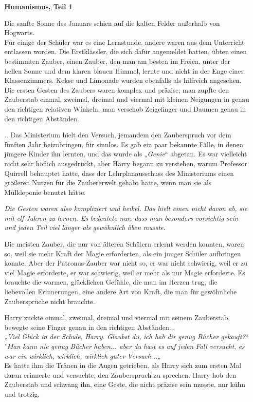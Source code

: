 

\hypertarget{humanismus-teil-1}{%

\textbf{\uline{Humanismus, Teil 1}}

\hfill\break Die sanfte Sonne des Januars schien auf die kalten Felder außerhalb von Hogwarts.\\ Für einige der Schüler war es eine Lernstunde, andere waren aus dem Unterricht entlassen worden. Die Erstklässler, die sich dafür angemeldet hatten, übten einen bestimmten Zauber, einen Zauber, den man am besten im Freien, unter der hellen Sonne und dem klaren blauen Himmel, lernte und nicht in der Enge eines Klassenzimmers. Kekse und Limonade wurden ebenfalls als hilfreich angesehen. Die ersten Gesten des Zaubers waren komplex und präzise; man zupfte den Zauberstab einmal, zweimal, dreimal und viermal mit kleinen Neigungen in genau den richtigen relativen Winkeln, man verschob Zeigefinger und Daumen genau in den richtigen Abständen.

.. Das Ministerium hielt den Versuch, jemandem den Zauberspruch vor dem fünften Jahr beizubringen, für sinnlos. Es gab ein paar bekannte Fälle, in denen jüngere Kinder ihn lernten, und das wurde als „\emph{Genie}“ abgetan. Es war vielleicht nicht sehr höflich ausgedrückt, aber Harry begann zu verstehen, warum Professor Quirrell behauptet hatte, dass der Lehrplanausschuss des Ministeriums einen größeren Nutzen für die Zaubererwelt gehabt hätte, wenn man sie als Mülldeponie benutzt hätte.

\emph{Die Gesten waren also kompliziert und heikel. Das hielt einen nicht davon ab, sie mit elf Jahren zu lernen. Es bedeutete nur, dass man besonders vorsichtig sein und jeden Teil viel länger als gewöhnlich üben musste.}

Die meisten Zauber, die nur von älteren Schülern erlernt werden konnten, waren so, weil sie mehr Kraft der Magie erforderten, als ein junger Schüler aufbringen konnte. Aber der Patronus-Zauber war nicht so, er war nicht schwierig, weil er zu viel Magie erforderte, er war schwierig, weil er mehr als nur Magie erforderte. Es brauchte die warmen, glücklichen Gefühle, die man im Herzen trug, die liebevollen Erinnerungen, eine andere Art von Kraft, die man für gewöhnliche Zaubersprüche nicht brauchte.

Harry zuckte einmal, zweimal, dreimal und viermal mit seinem Zauberstab, bewegte seine Finger genau in den richtigen Abständen...\\ „\emph{Viel Glück in der Schule, Harry. Glaubst du, ich hab dir genug Bücher gekauft?}“\\ "\emph{Man kann nie genug Bücher haben... aber du hast es auf jeden Fall versucht, es war ein wirklich, wirklich, wirklich guter Versuch...„}\\ Es hatte ihm die Tränen in die Augen getrieben, als Harry sich zum ersten Mal daran erinnerte und versuchte, den Zauberspruch zu sprechen. Harry hob den Zauberstab und schwang ihn, eine Geste, die nicht präzise sein musste, nur kühn und trotzig.

}
